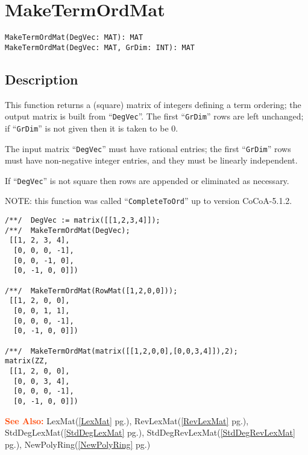 \documentclass[a4paper]{mybook}
\newenvironment{command}{}{} %
\newcommand\SeeAlso{\par\textcolor{OrangeRed}{\textbf{\large See Also: }}}
\begin{document}
\section{MakeTermOrdMat}
\label{MakeTermOrdMat}
\begin{command} %


\begin{Verbatim}[label=syntax, rulecolor=\color{MidnightBlue},
frame=single]
MakeTermOrdMat(DegVec: MAT): MAT
MakeTermOrdMat(DegVec: MAT, GrDim: INT): MAT
\end{Verbatim}


\subsection*{Description}

This function returns a (square) matrix of integers defining a term
ordering; the output matrix is built from ``\verb&DegVec&''.  The first ``\verb&GrDim&''
rows are left unchanged; if ``\verb&GrDim&'' is not given then it is taken to be 0.
\par 
The input matrix ``\verb&DegVec&'' must have rational entries; the first ``\verb&GrDim&''
rows must have non-negative integer entries, and they must be linearly
independent.
\par 
If ``\verb&DegVec&'' is not square then rows are appended or eliminated as necessary.
\par 
NOTE: this function was called ``\verb&CompleteToOrd&'' up to version CoCoA-5.1.2.
\begin{Verbatim}[label=example, rulecolor=\color{PineGreen}, frame=single]
/**/  DegVec := matrix([[1,2,3,4]]);
/**/  MakeTermOrdMat(DegVec);
 [[1, 2, 3, 4],
  [0, 0, 0, -1],
  [0, 0, -1, 0],
  [0, -1, 0, 0]])

/**/  MakeTermOrdMat(RowMat([1,2,0,0]));
 [[1, 2, 0, 0],
  [0, 0, 1, 1],
  [0, 0, 0, -1],
  [0, -1, 0, 0]])

/**/  MakeTermOrdMat(matrix([[1,2,0,0],[0,0,3,4]]),2);
matrix(ZZ,
 [[1, 2, 0, 0],
  [0, 0, 3, 4],
  [0, 0, 0, -1],
  [0, -1, 0, 0]])
\end{Verbatim}


\SeeAlso %
  LexMat(\ref{LexMat} pg.\pageref{LexMat}), 
    RevLexMat(\ref{RevLexMat} pg.\pageref{RevLexMat}), 
    StdDegLexMat(\ref{StdDegLexMat} pg.\pageref{StdDegLexMat}), 
    StdDegRevLexMat(\ref{StdDegRevLexMat} pg.\pageref{StdDegRevLexMat}), 
    NewPolyRing(\ref{NewPolyRing} pg.\pageref{NewPolyRing})
\end{command} %
\end{document}
